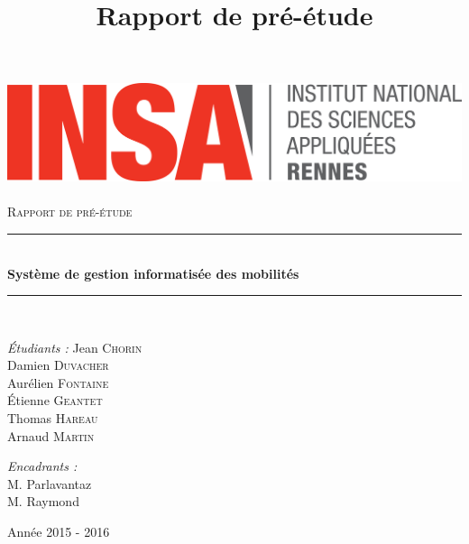 \documentclass[10pt,a4paper]{article}
\title{Rapport de pré-étude}
\newcommand{\HRule}{\rule{\linewidth}{0.5mm}}
\begin{document}
	
	\begin{titlepage}
		\begin{sffamily}
			\begin{center}
				
				\includegraphics[width=400pt]{logo_INSA.png}~\\[2.5cm]
				
				\textsc{\huge Rapport de pré-étude}\\[2.5cm]
				
				\HRule \\[0.4cm]
				{ \huge \bfseries Système de gestion informatisée des mobilités\\[0.4cm] }
				
				\HRule \\[4cm]
				
				\begin{minipage}{0.4\textwidth}
					\begin{flushleft} \large
						\emph{Étudiants :}
						Jean \textsc{Chorin}\\
						Damien \textsc{Duvacher}\\
						Aurélien \textsc{Fontaine}\\
						Étienne \textsc{Geantet}\\
						Thomas \textsc{Hareau}\\
						Arnaud \textsc{Martin}\\
					\end{flushleft}
				\end{minipage}
				\begin{minipage}{0.5\textwidth}
					\begin{flushright} \large
						\emph{Encadrants :} \\
						M. Parlavantaz\\
						M. Raymond
					\end{flushright}
				\end{minipage}
				
				\vfill
				
				{\large Année 2015 - 2016}
				
			\end{center}
		\end{sffamily}
	\end{titlepage}
	
\end{document}
